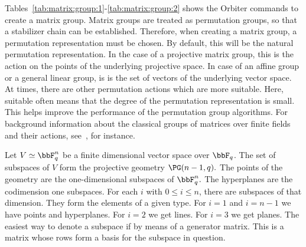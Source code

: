 Tables~\ref{tab:matrix:group:1}-\ref{tab:matrix:group:2} shows the Orbiter commands to create a matrix group.
Matrix groups are treated as permutation groups, 
so that a stabilizer chain can be established. 
Therefore, when creating a matrix group, a permutation representation must be chosen.
By default, this will be 
the natural permutation representation. 
In the case of a projective matrix group, this is the action on the points of the underlying projective space.
In case of an affine group or a general linear group, 
is is the set of vectors of the underlying vector space.
At times, there are other permutation actions which are more suitable. 
Here, suitable often means that the degree of the permutation representation is small. 
This helps improve the performance of the permutation group algorithms. 
For background information about the classical groups of matrices 
over finite fields and their actions, 
see~\cite{Taylor1992}, for instance. 


\bigskip

Let $V \simeq \bbF_q^n$
be a finite dimensional vector space over $\bbF_q$. 
The set of subspaces of $V$ form the projective geometry $\PG(n-1,q).$
The points of the geometry are the one-dimensional subspaces of $\bbF_q^n.$
The hyperplanes are the codimension one subspaces. 
For each $i$ with $0 \le i \le n$, there are subspaces of that dimension. 
They form the elements of a given type. 
For $i=1$ and $i=n-1$ we have points and hyperplanes. 
For $i=2$ we get lines. 
For $i=3$ we get planes.
The easiest way to denote a subspace if by means of a generator matrix. 
This is a matrix whose rows form a basis for the subspace in question. 


\bigskip

